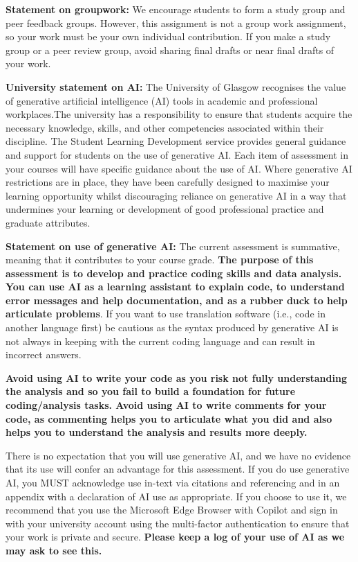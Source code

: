 \documentclass[
  english,
  letterpaper,
  DIV=11,
  numbers=noendperiod]{scrreprt}
\begin{document}
\textbf{Statement on groupwork:} We encourage students to form a study
group and peer feedback groups. However, this assignment is not a group
work assignment, so your work must be your own individual contribution.
If you make a study group or a peer review group, avoid sharing final
drafts or near final drafts of your work.

\textbf{University statement on AI:} The University of Glasgow
recognises the value of generative artificial intelligence (AI) tools in
academic and professional workplaces.The university has a responsibility
to ensure that students acquire the necessary knowledge, skills, and
other competencies associated within their discipline. The Student
Learning Development service provides general guidance and support for
students on the use of generative AI. Each item of assessment in your
courses will have specific guidance about the use of AI. Where
generative AI restrictions are in place, they have been carefully
designed to maximise your learning opportunity whilst discouraging
reliance on generative AI in a way that undermines your learning or
development of good professional practice and graduate attributes.

\textbf{Statement on use of generative AI:} The current assessment is
summative, meaning that it contributes to your course grade. \textbf{The
purpose of this assessment is to develop and practice coding skills and
data analysis. You can use AI as a learning assistant to explain code,
to understand error messages and help documentation, and as a rubber
duck to help articulate problems}. If you want to use translation
software (i.e., code in another language first) be cautious as the
syntax produced by generative AI is not always in keeping with the
current coding language and can result in incorrect answers.

\textbf{Avoid using AI to write your code as you risk not fully
understanding the analysis and so you fail to build a foundation for
future coding/analysis tasks. Avoid using AI to write comments for your
code, as commenting helps you to articulate what you did and also helps
you to understand the analysis and results more deeply.}

There is no expectation that you will use generative AI, and we have no
evidence that its use will confer an advantage for this assessment. If
you do use generative AI, you MUST acknowledge use in-text via citations
and referencing and in an appendix with a declaration of AI use as
appropriate. If you choose to use it, we recommend that you use the
Microsoft Edge Browser with Copilot and sign in with your university
account using the multi-factor authentication to ensure that your work
is private and secure. \textbf{Please keep a log of your use of AI as we
may ask to see this.}
\end{document}
